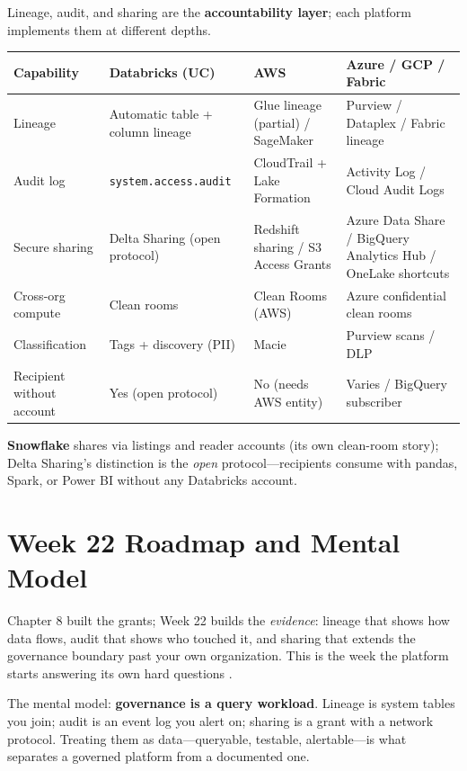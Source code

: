 \begin{crosscloud}
Lineage, audit, and sharing are the \textbf{accountability layer}; each platform implements them
at different depths.

\vspace{2mm}
{\footnotesize
\begin{tabular}{@{}p{3.0cm}p{3.4cm}p{3.2cm}p{3.2cm}@{}}
\toprule
\textbf{Capability} & \textbf{Databricks (UC)} & \textbf{AWS} & \textbf{Azure / GCP / Fabric} \\
\midrule
Lineage & Automatic table + column lineage & Glue lineage (partial) / SageMaker & Purview / Dataplex / Fabric lineage \\
Audit log & \texttt{system.access.audit} & CloudTrail + Lake Formation & Activity Log / Cloud Audit Logs \\
Secure sharing & Delta Sharing (open protocol) & Redshift sharing / S3 Access Grants & Azure Data Share / BigQuery Analytics Hub / OneLake shortcuts \\
Cross-org compute & Clean rooms & Clean Rooms (AWS) & Azure confidential clean rooms \\
Classification & Tags + discovery (PII) & Macie & Purview scans / DLP \\
Recipient without account & Yes (open protocol) & No (needs AWS entity) & Varies / BigQuery subscriber \\
\bottomrule
\end{tabular}}

\vspace{1mm}
\textbf{Snowflake} shares via listings and reader accounts (its own clean-room story); Delta
Sharing's distinction is the \emph{open} protocol---recipients consume with pandas, Spark, or
Power BI without any Databricks account.
\end{crosscloud}

\section{Week 22 Roadmap and Mental Model}
Chapter 8 built the grants; Week 22 builds the \emph{evidence}: lineage that shows how data flows, audit that shows who touched it, and sharing that extends the governance boundary past your own organization. This is the week the platform starts answering its own hard questions \cite{databricksLineage,databricksSystemTables}.

The mental model: \textbf{governance is a query workload}. Lineage is system tables you join; audit is an event log you alert on; sharing is a grant with a network protocol. Treating them as data---queryable, testable, alertable---is what separates a governed platform from a documented one.

